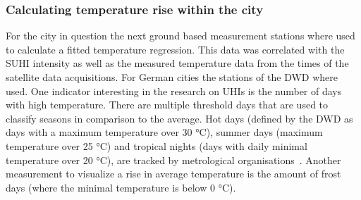 \documentclass[12pt,a4paper, english,twoside]{scrartcl}
\begin{document}
    \subsubsection{Calculating temperature rise within the city}
      For the city in question the next ground based measurement stations where used to calculate a fitted temperature regression. 
      This data was correlated with the \gls{SUHI} intensity as well as the measured temperature data from the times of the satellite data acquisitions. 
      For German cities the stations of the \gls{DWD} where used.
      One indicator interesting in the research on \glspl{UHI} is the number of days with high temperature.
      There are multiple threshold days that are used to classify seasons in comparison to the average.
      Hot days (defined by the \gls{DWD} as days with a maximum temperature over 30 °C), summer days (maximum temperature over 25 °C) and tropical nights (days with daily minimal temperature over 20 °C), are tracked by metrological organisations~\autocite{dwdklimalexikon}.
      Another measurement to visualize a rise in average temperature is the amount of frost days (where the minimal temperature is below 0 °C). 
\end{document}
